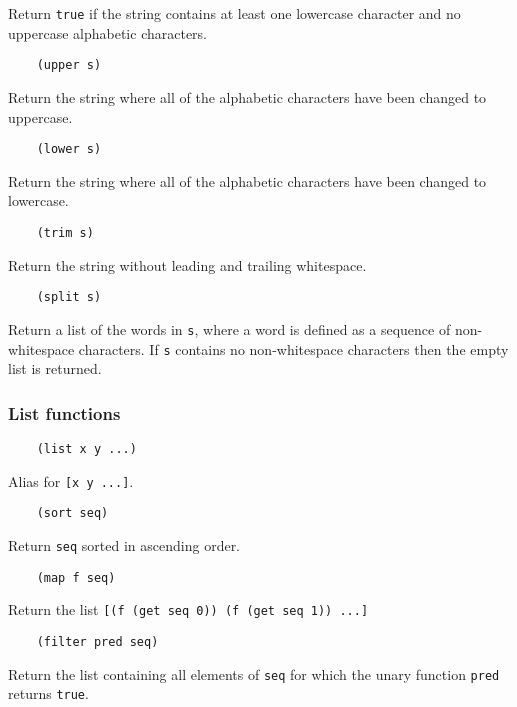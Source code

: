 \documentclass{article}
\newcommand{\inlinecode}{\texttt}
\begin{document}
Return \inlinecode{true} if the string contains at least one lowercase character and no uppercase alphabetic characters.

\begin{verbatim}
    (upper s)
\end{verbatim}

Return the string where all of the alphabetic characters have been changed to uppercase.

\begin{verbatim}
    (lower s)
\end{verbatim}

Return the string where all of the alphabetic characters have been changed to lowercase.

\begin{verbatim}
    (trim s)
\end{verbatim}

Return the string without leading and trailing whitespace.

\begin{verbatim}
    (split s)
\end{verbatim}

Return a list of the words in \inlinecode{s}, where a word is defined as a sequence of non-whitespace characters. If \inlinecode{s} contains no non-whitespace characters then the empty list is returned.

\subsubsection{List functions}
\begin{verbatim}
    (list x y ...)
\end{verbatim}

Alias for \inlinecode{[x y ...]}.

\begin{verbatim}
    (sort seq)
\end{verbatim}

Return \inlinecode{seq} sorted in ascending order.

\begin{verbatim}
    (map f seq)
\end{verbatim}

Return the list \inlinecode{[(f (get seq 0)) (f (get seq 1)) ...]}

\begin{verbatim}
    (filter pred seq)
\end{verbatim}

Return the list containing all elements of \inlinecode{seq} for which the unary function \inlinecode{pred} returns \inlinecode{true}.
\end{document}

